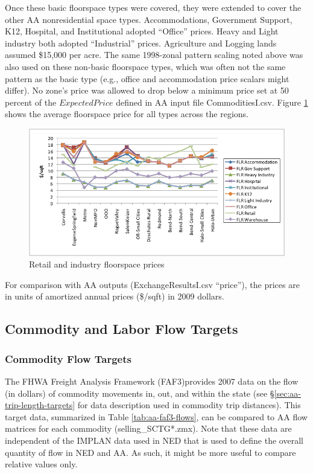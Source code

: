 Once these basic floorspace types were covered, they were extended to cover the other AA nonresidential space types. Accommodations, Government Support, K12, Hospital, and Institutional adopted ``Office'' prices. Heavy and Light industry both adopted ``Industrial'' prices. Agriculture and Logging lands assumed \$15,000 per acre. The same 1998-zonal pattern scaling noted above was also used on these non-basic floorspace types, which was often not the same pattern as the basic type (e.g., office and accommodation price scalars might differ). No zone's price was allowed to drop below a minimum price set at 50 percent of the $ExpectedPrice$ defined in AA input file CommoditiesI.csv. Figure \ref{fig:aa-retail-floorspace-prices} shows the average floorspace price for all types across the regions.

\begin{figure}    %
\centering
\includegraphics[width=6.0in]{aa/retail-floorspace-prices}
\caption{Retail and industry floorspace prices}
\label{fig:aa-retail-floorspace-prices}
\end{figure}

For comparison with AA outputs (ExchangeResultsI.csv ``price''), the prices are in units of amortized annual prices (\$/sqft) in 2009 dollars. 

\subsection{Commodity and Labor Flow Targets}

\subsubsection{Commodity Flow Targets}
The FHWA Freight Analysis Framework (FAF3)provides 2007 data on the flow (in dollars) of commodity movements in, out, and within the state (see \S\ref{sec:aa-trip-length-targets} for data description used in commodity trip distances). This target data, summarized in Table \ref{tab:aa-faf3-flows}, can be compared to AA flow matrices for each commodity (selling\_SCTG*.zmx). Note that these data are independent of the IMPLAN data used in NED that is used to define the overall quantity of flow in NED and AA. As such, it might be more useful to compare relative values only.

